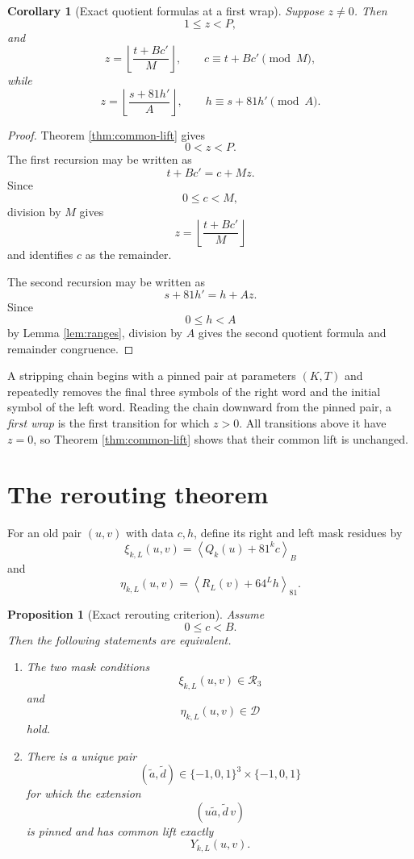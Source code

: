\documentclass[11pt]{article}
\newtheorem{proposition}[theorem]{Proposition}
\newtheorem{corollary}[theorem]{Corollary}
\theoremstyle{remark}
\newcommand{\E}{\{-1,0,1\}}
\newcommand{\Rset}{\mathcal{R}}
\newcommand{\Dset}{\mathcal{D}}
\newcommand{\res}[2]{\left\langle #1\right\rangle_{#2}}
\begin{document}
\begin{corollary}[Exact quotient formulas at a first wrap]
\label{cor:quotients}
Suppose \(z\ne0\).  Then
\[
1\le z<P,
\]
and
\[
z=
\left\lfloor
\frac{t+Bc'}{M}
\right\rfloor,
\qquad
c\equiv t+Bc'\pmod M,
\]
while
\[
z=
\left\lfloor
\frac{s+81h'}{A}
\right\rfloor,
\qquad
h\equiv s+81h'\pmod A.
\]
\end{corollary}

\begin{proof}
Theorem \ref{thm:common-lift} gives
\[
0<z<P.
\]
The first recursion may be written as
\[
t+Bc'=c+Mz.
\]
Since
\[
0\le c<M,
\]
division by \(M\) gives
\[
z=
\left\lfloor
\frac{t+Bc'}{M}
\right\rfloor
\]
and identifies \(c\) as the remainder.

The second recursion may be written as
\[
s+81h'=h+Az.
\]
Since
\[
0\le h<A
\]
by Lemma \ref{lem:ranges}, division by \(A\) gives the second quotient formula and remainder congruence.
\end{proof}

A stripping chain begins with a pinned pair at parameters \((K,T)\) and repeatedly removes the final three symbols of the right word and the initial symbol of the left word.  Reading the chain downward from the pinned pair, a \emph{first wrap} is the first transition for which \(z>0\).  All transitions above it have \(z=0\), so Theorem \ref{thm:common-lift} shows that their common lift is unchanged.

\section{The rerouting theorem}

For an old pair \((u,v)\) with data \(c,h\), define its right and left mask residues by
\[
\xi_{k,L}(u,v)
=
\res{Q_k(u)+81^kc}{B}
\]
and
\[
\eta_{k,L}(u,v)
=
\res{R_L(v)+64^Lh}{81}.
\]

\begin{proposition}[Exact rerouting criterion]
\label{prop:rerouting}
Assume
\[
0\le c<B.
\]
Then the following statements are equivalent.

\begin{enumerate}
\item The two mask conditions
\[
\xi_{k,L}(u,v)\in\Rset_3
\]
and
\[
\eta_{k,L}(u,v)\in\Dset
\]
hold.

\item There is a unique pair
\[
(\widetilde a,\widetilde d)\in\E^3\times\E
\]
for which the extension
\[
(u\widetilde a,\widetilde d\,v)
\]
is pinned and has common lift exactly
\[
Y_{k,L}(u,v).
\]
\end{enumerate}
\end{proposition}
\end{document}
